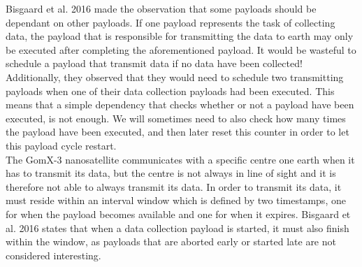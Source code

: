 Bisgaard et al. 2016\cite{gomx3} made the observation that some payloads should be dependant on other payloads. If one payload represents the task of collecting data, the payload that is responsible for transmitting the data to earth may only be executed after completing the aforementioned payload. It would be wasteful to schedule a payload that transmit data if no data have been collected! Additionally, they observed that they would need to schedule two transmitting payloads when one of their data collection payloads had been executed. This means that a simple dependency that checks whether or not a payload have been executed, is not enough. We will sometimes need to also check how many times the payload have been executed, and then later reset this counter in order to let this payload cycle restart.\\
The GomX-3 nanosatellite communicates with a specific centre one earth when it has to transmit its data, but the centre is not always in line of sight and it is therefore not able to always transmit its data. In order to transmit its data, it must reside within an interval window which is defined by two timestamps, one for when the payload becomes available and one for when it expires. Bisgaard et al. 2016\cite{gomx3} states that when a data collection payload is started, it must also finish within the window, as payloads that are aborted early or started late are not considered interesting.
